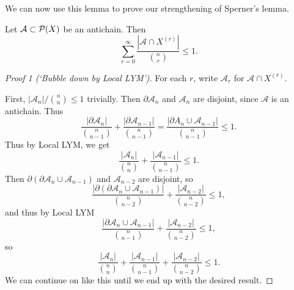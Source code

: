 \documentclass[a4paper]{scrartcl}
\newcommand{\A}{\mathcal{A}}
\begin{document}
We can now use this lemma to prove our strengthening of Sperner's lemma.

\begin{theorem}
    Let $\A \subset \power(X)$ be an antichain. Then
    $$
\sum_{r = 0}^{\infty} \frac{|\A \cap X^{(r)}|}{\binom{n}{r}} \leq 1.
    $$
\end{theorem}
\begin{proof}[Proof 1 (`Bubble down by Local LYM')]
    For each $r$, write $\A_r$ for $\A \cap X^{(r)}$.
    
    First, $|\A_n| / \binom{n}{n} \leq 1$ trivially. Then $\partial \A_n$ and $\A_n$ are disjoint, since $\A$ is an antichain. Thus
    $$
    \frac{|\partial \A_n|}{\binom{n}{n - 1}} + \frac{|\partial \A_{n - 1}|}{\binom{n}{n - 1}} = \frac{|\partial A_n \cup \A_{n - 1}|}{\binom{n}{n - 1}} \leq 1.
    $$
    Thus by Local LYM, we get
    $$
    \frac{|\A_n|}{\binom{n}{n}} + \frac{|\A_{n - 1}|}{\binom{n}{n - 1}} \leq 1.
    $$
    Then $\partial(\partial \A_n \cup \A_{n - 1})$ and $\A_{n - 2}$ are disjoint, so
    $$
\frac{|\partial(\partial \A_n \cup \A_{n - 1})|}{\binom{n}{n - 2}} + \frac{|\A_{n - 2}|}{\binom{n}{n - 2}} \leq 1,
    $$
    and thus by Local LYM
    $$
    \frac{|\partial \A_n \cup \A_{n - 1}|}{\binom{n}{n - 1}} + \frac{|\A_{n - 2}|}{\binom{n}{n - 2}} \leq 1,
    $$
    so
    $$
    \frac{|\A_n|}{\binom{n}{n}} + \frac{|\A_{n - 1}|}{\binom{n}{n - 1}} + \frac{|\A_{n - 2}|}{\binom{n}{n - 2}}  \leq 1.
    $$
    We can continue on like this until we end up with the desired result.
\end{proof}
\end{document}
